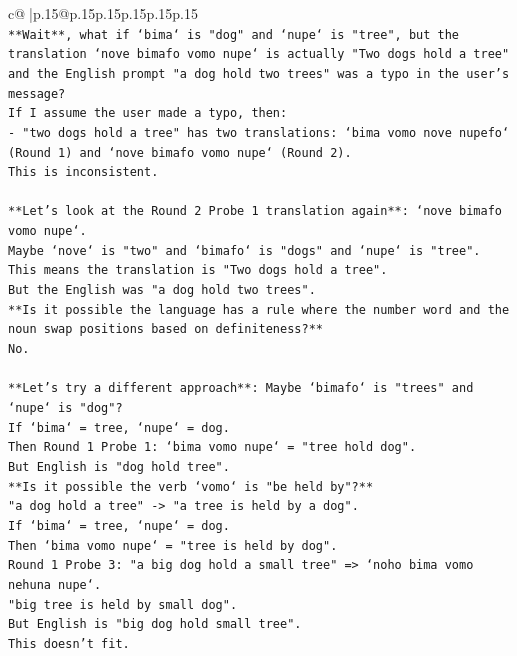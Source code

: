 \documentclass{article}
\begin{document}
{\begin{supertabular}{c@{$\;$}|p{.15\linewidth}@{}p{.15\linewidth}p{.15\linewidth}p{.15\linewidth}p{.15\linewidth}p{.15\linewidth}}
{{{\\ 
\texttt{**Wait**, what if `bima` is "dog" and `nupe` is "tree", but the translation `nove bimafo vomo nupe` is actually "Two dogs hold a tree" and the English prompt "a dog hold two trees" was a typo in the user's message?} \\
\texttt{If I assume the user made a typo, then:} \\
\texttt{{-} "two dogs hold a tree" has two translations: `bima vomo nove nupefo` (Round 1) and `nove bimafo vomo nupe` (Round 2).} \\
\texttt{This is inconsistent.} \\
\\ 
\texttt{**Let's look at the Round 2 Probe 1 translation again**: `nove bimafo vomo nupe`.} \\
\texttt{Maybe `nove` is "two" and `bimafo` is "dogs" and `nupe` is "tree".} \\
\texttt{This means the translation is "Two dogs hold a tree".} \\
\texttt{But the English was "a dog hold two trees".} \\
\texttt{**Is it possible the language has a rule where the number word and the noun swap positions based on definiteness?**} \\
\texttt{No.} \\
\\ 
\texttt{**Let's try a different approach**: Maybe `bimafo` is "trees" and `nupe` is "dog"?} \\
\texttt{If `bima` = tree, `nupe` = dog.} \\
\texttt{Then Round 1 Probe 1: `bima vomo nupe` = "tree hold dog".} \\
\texttt{But English is "dog hold tree".} \\
\texttt{**Is it possible the verb `vomo` is "be held by"?**} \\
\texttt{"a dog hold a tree" {-}> "a tree is held by a dog".} \\
\texttt{If `bima` = tree, `nupe` = dog.} \\
\texttt{Then `bima vomo nupe` = "tree is held by dog".} \\
\texttt{Round 1 Probe 3: "a big dog hold a small tree" => `noho bima vomo nehuna nupe`.} \\
\texttt{"big tree is held by small dog".} \\
\texttt{But English is "big dog hold small tree".} \\
\texttt{This doesn't fit.} \\
}}}
\end{supertabular}}
\end{document}

